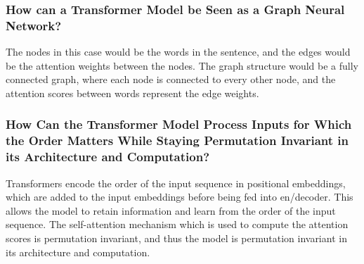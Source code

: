 \documentclass[a4paper]{article}
\begin{document}
\subsubsection{How can a Transformer Model be Seen as a Graph Neural Network?}
The nodes in this case would be the words in the sentence, and the edges would be the attention weights between
the nodes. The graph structure would be a fully connected graph, where each node is connected to every other node,
and the attention scores between words represent the edge weights.

\subsubsection{How Can the Transformer Model Process Inputs for Which the Order Matters While Staying Permutation
Invariant in its Architecture and Computation?}
Transformers encode the order of the input sequence in positional embeddings, which are added to the input embeddings
before being fed into en/decoder. This allows the model to retain information and learn from the order of the input
sequence. The self-attention mechanism which is used to compute the attention scores is permutation invariant, and
thus the model is permutation invariant in its architecture and computation.
\end{document}
